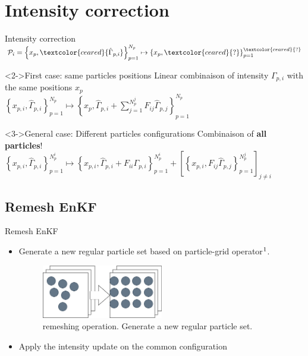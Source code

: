 \documentclass[aspectratio=169]{beamer} %
\begin{document}
\section{Intensity correction}
\begin{frame}{Intensity correction}
    $\mathcal{P}_i = \left\{x_p, \textcolor{ceared}{\hat \Gamma_{p, i}}\right\}_{p=1}^{N_p} \mapsto \left\{x_p, \textcolor{ceared}{?} \right\}_{p=1}^{\textcolor{ceared}{?}}$

    \begin{block}<2->{First case: same particles positions}
        Linear combinaison of intensity $\Gamma_{p,i}$ with the same positions $x_p$\\
        $\left\{x_{p,i}, \hat \Gamma_{p,i}\right\}_{p=1}^{N_p} \mapsto \left\{x_p, \hat \Gamma_{p, i} + \sum_{j=1}^{N_p^j} F_{ij} \hat \Gamma_{p,j} \right\}_{p=1}^{N_p}$
    \end{block}

    \begin{block}<3->{General case: Different particles configurations}
        Combinaison of \textbf{all particles}! \\
        $ \left\{x_{p,i}, \hat \Gamma_{p,i}\right\}_{p=1}^{N^i_p} \mapsto \left\{x_{p,i}, \hat \Gamma_{p,i} + F_{ii}\Gamma_{p,i} \right\}_{p=1}^{N_p^i} + \left[\left\{x_{p,i}, F_{ij} \hat \Gamma_{p,j}\right\}_{p=1}^{N_p^j}\right]_{j\neq i}$ \\
    \end{block}
\end{frame}

\subsection{Remesh EnKF}
\begin{frame}{Remesh EnKF}
    \subtitle{Regrid on a common particle configuration}
    \begin{itemize}
        \item Generate a new regular particle set based on particle-grid operator$\footnotemark[1]$.
              \begin{figure}
                  \centering
                  \includegraphics[width=0.5\textwidth]{images/remesh_enkf.png}
                  \caption{remeshing operation. Generate a new regular particle set.}
              \end{figure}
        \item Apply the intensity update on the common configuration
    \end{itemize}

\end{frame}
\end{document}
